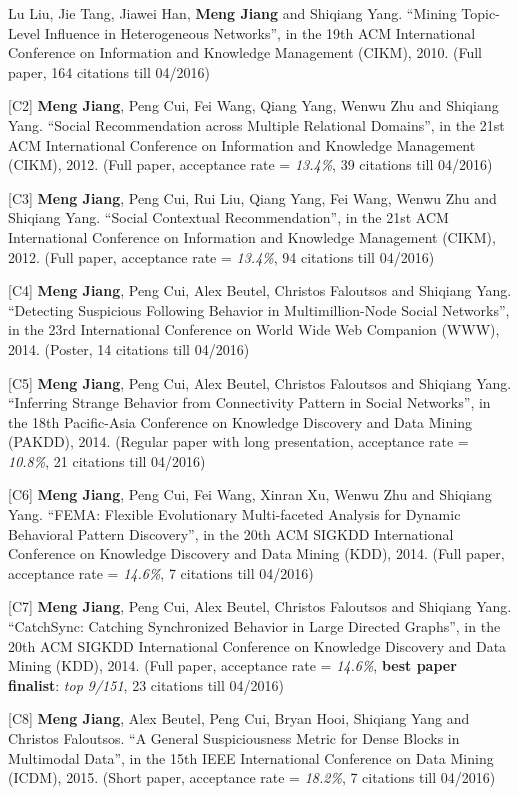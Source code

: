 \documentclass[margin, 10pt]{res} %
\begin{document}
\begin{resume}
[C1] Lu Liu, Jie Tang, Jiawei Han, {\bf Meng Jiang} and Shiqiang Yang. ``Mining Topic-Level Influence in Heterogeneous Networks'', in the 19th ACM International Conference on Information and Knowledge Management (CIKM), 2010. (Full paper, 164 citations till 04/2016)

[C2] {\bf Meng Jiang}, Peng Cui, Fei Wang, Qiang Yang, Wenwu Zhu and Shiqiang Yang. ``Social Recommendation across Multiple Relational Domains'', in the 21st ACM International Conference on Information and Knowledge Management (CIKM), 2012. (Full paper, acceptance rate = {\em 13.4\%}, 39 citations till 04/2016)

[C3] {\bf Meng Jiang}, Peng Cui, Rui Liu, Qiang Yang, Fei Wang, Wenwu Zhu and Shiqiang Yang. ``Social Contextual Recommendation'', in the 21st ACM International Conference on Information and Knowledge Management (CIKM), 2012. (Full paper, acceptance rate = {\em 13.4\%}, 94 citations till 04/2016)

[C4] {\bf Meng Jiang}, Peng Cui, Alex Beutel, Christos Faloutsos and Shiqiang Yang. ``Detecting Suspicious Following Behavior in Multimillion-Node Social Networks'', in the 23rd International Conference on World Wide Web Companion (WWW), 2014. (Poster, 14 citations till 04/2016)

[C5] {\bf Meng Jiang}, Peng Cui, Alex Beutel, Christos Faloutsos and Shiqiang Yang. ``Inferring Strange Behavior from Connectivity Pattern in Social Networks'', in the 18th Pacific-Asia Conference on Knowledge Discovery and Data Mining (PAKDD), 2014. (Regular paper with long presentation, acceptance rate = {\em 10.8\%}, 21 citations till 04/2016)

[C6] {\bf Meng Jiang}, Peng Cui, Fei Wang, Xinran Xu, Wenwu Zhu and Shiqiang Yang. ``FEMA: Flexible Evolutionary Multi-faceted Analysis for Dynamic Behavioral Pattern Discovery'', in the 20th ACM SIGKDD International Conference on Knowledge Discovery and Data Mining (KDD), 2014. (Full paper, acceptance rate = {\em 14.6\%}, 7 citations till 04/2016)

[C7] {\bf Meng Jiang}, Peng Cui, Alex Beutel, Christos Faloutsos and Shiqiang Yang. ``CatchSync: Catching Synchronized Behavior in Large Directed Graphs'', in the 20th ACM SIGKDD International Conference on Knowledge Discovery and Data Mining (KDD), 2014. (Full paper, acceptance rate = {\em 14.6\%}, {\bf best paper finalist}: {\em top 9/151}, 23 citations till 04/2016)

[C8] {\bf Meng Jiang}, Alex Beutel, Peng Cui, Bryan Hooi, Shiqiang Yang and Christos Faloutsos. ``A General Suspiciousness Metric for Dense Blocks in Multimodal Data'', in the 15th IEEE International Conference on Data Mining (ICDM), 2015. (Short paper, acceptance rate = {\em 18.2\%}, 7 citations till 04/2016)


\end{resume}
\end{document}
